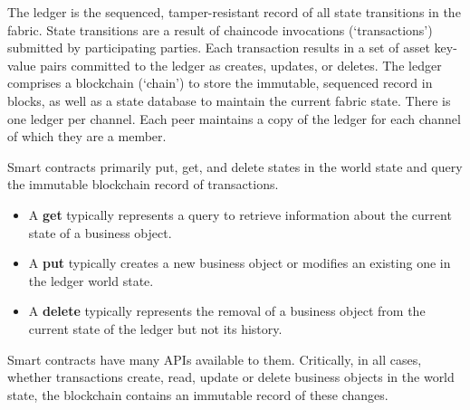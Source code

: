 The ledger is the sequenced, tamper-resistant record of all state transitions in the fabric. State transitions are a result of chaincode invocations (‘transactions’) submitted by participating parties. Each transaction results in a set of asset key-value pairs committed to the ledger as creates, updates, or deletes. The ledger comprises a blockchain (‘chain’) to store the immutable, sequenced record in blocks, as well as a state database to maintain the current fabric state. There is one ledger per channel. Each peer maintains a copy of the ledger for each channel of which they are a member.

Smart contracts primarily put, get, and delete states in the world state and query the immutable blockchain record of transactions.

\begin{itemize}
\item A \textbf{get} typically represents a query to retrieve information about the current state of a business object.
\item A \textbf{put} typically creates a new business object or modifies an existing one in the ledger world state.
\item A \textbf{delete} typically represents the removal of a business object from the current state of the ledger but not its history.
\end{itemize}

Smart contracts have many APIs available to them. Critically, in all cases, whether transactions create, read, update or delete business objects in the world state, the blockchain contains an immutable record of these changes.

